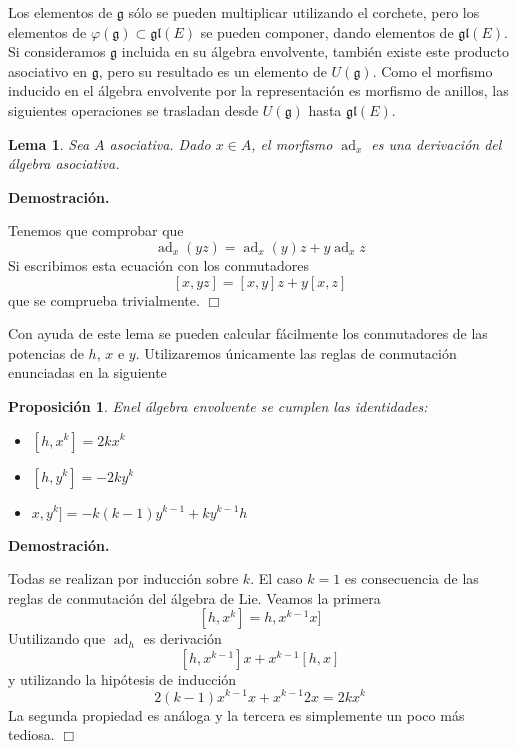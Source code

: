 \documentclass[a4paper,draft,12pt]{article}
\newtheorem{lema}[teo]{Lema}%
\newtheorem{propo}[teo]{Proposición}%
\newcommand{\dem}{\noindent \textbf{Demostración. }\vspace{0.3 cm}}%
\newcommand{\g}{\mathfrak{g}}%
\newcommand{\fin}{ $\Box $ \vspace{0.4 cm}}
\DeclareMathOperator{\ad}{ad}  %
\begin{document}
\bigskip

Los elementos de $\g$ sólo se pueden multiplicar utilizando el corchete, pero los elementos de $\varphi(\g)\subset \mathfrak{gl}(E)$ se pueden componer, dando elementos de $\mathfrak{gl}(E)$.  Si consideramos $\g$ incluida en su álgebra envolvente, también existe este producto asociativo en $\g$, pero su resultado es un elemento de $U(\g)$.  Como el morfismo inducido en el álgebra envolvente por la representación es morfismo de anillos, las siguientes operaciones se trasladan desde $U(\g)$ hasta $\mathfrak{gl}(E)$.

\begin{lema}

Sea $A$ asociativa.  Dado $x \in A$, el morfismo $\ad_x$ es una derivación del álgebra asociativa.

\end{lema}

\dem

Tenemos que comprobar que 
$$
\ad_x(yz)= \ad_x(y)z+y\ad_xz
$$
Si escribimos esta ecuación con los conmutadores
$$
[x,yz]=[x,y]z+y[x,z]
$$
que se comprueba trivialmente. \fin

Con ayuda de este lema se pueden calcular fácilmente los conmutadores de las potencias de $h$, $x$ e $y$. Utilizaremos únicamente las reglas de conmutación enunciadas en la siguiente

\begin{propo}

Enel álgebra envolvente se cumplen las identidades:

\begin{itemize}

\item $ [h,x^k]= 2kx^k$

\item $[h,y^k]= -2ky^k$

\item $ x,y^k]=-k(k-1)y^{k-1}+ky^{k-1}h$

\end{itemize}

\end{propo}

\dem


Todas se realizan por inducción sobre $k$.  El caso $k=1$ es consecuencia de las reglas de conmutación del álgebra de Lie.  Veamos la primera
$$
[h,x^k]= h,x^{k-1}x]
$$
Uutilizando que $\ad_h$ es derivación
$$
[h,x^{k-1}]x+x^{k-1}[h,x]
$$
y utilizando la hipótesis de inducción
$$
2(k-1)x^{k-1} x+x^{k-1}2x= 2kx^k
$$
La segunda propiedad es análoga y la tercera es simplemente un poco más tediosa. \fin
\end{document}
